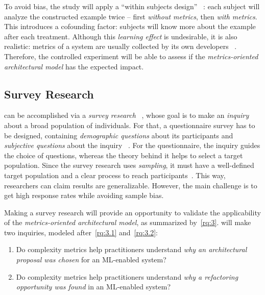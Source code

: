   To avoid bias, the study will apply a ``within subjects design''%
  ~\parencite{Easterbrook2008SelectingEngineering}: each subject will
  analyze the constructed example twice -- first \emph{without metrics},
  then \emph{with metrics}. This introduces a cofounding factor: subjects
  will know more about the example after each treatment. Although this
  \emph{learning effect} is undesirable, it is also realistic:
  metrics of a system are usually collected by its own developers%
  ~\parencite{Fenton2014SoftwareEdition}.
  Therefore, the controlled experiment will be able to assess if the
  \emph{metrics-oriented architectural model} has the expected impact.

  \subsection{Survey Research}
  \MethodologyStep

   can be accomplished via a \emph{survey research}%
  ~\parencite{Easterbrook2008SelectingEngineering}, whose goal is to
  make an \emph{inquiry} about a broad population of individuals.
  For that, a questionnaire survey has to be designed, containing
  \emph{demographic questions} about its participants and
  \emph{subjective questions} about the inquiry%
  ~\parencite{Easterbrook2008SelectingEngineering}.
  For the questionnaire, the inquiry guides the choice of questions,
  whereas the theory behind it helps to select a target population.
  Since the survey research uses \emph{sampling},
  it must have a well-defined target population and a clear process
  to reach participants~\parencite{Easterbrook2008SelectingEngineering}.
  This way, researchers can claim results are generalizable.
  However, the main challenge is to get high response rates
  while avoiding sample bias.

  Making a survey research will provide an opportunity to validate
  the applicability of the \emph{metrics-oriented architectural model},
  as summarized by~\cref{rq:3}.  will make two inquiries,
  modeled after~\cref{rq:3.1} and~\cref{rq:3.2}:
  \begin{enumerate}[label=Q\arabic*.]
    \item Do complexity metrics help practitioners understand \emph{why
          an architectural proposal was chosen} for an ML-enabled system?
          \label{it:sr_question_1}
    \item Do complexity metrics help practitioners understand \emph{why
          a refactoring opportunity was found} in an ML-enabled system?
          \label{it:sr_question_2}
  \end{enumerate}

